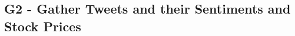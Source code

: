 

\subsection{G2 - Gather Tweets and their Sentiments and Stock Prices}
\label{ss:conclusion-summary-g2}







